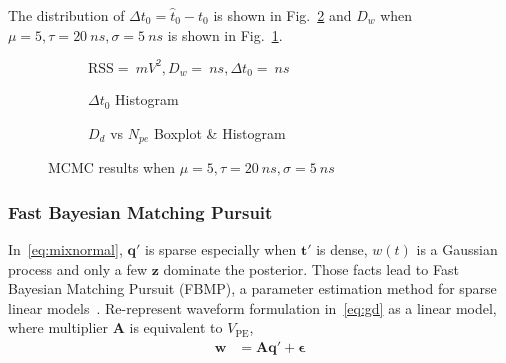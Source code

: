 The distribution of $\Delta{t_0} = \hat{t}_0 - t_0$ is shown in Fig.~\ref{fig:mcmc-t0hist} and $D_w$ when $\mu=5, \tau=\SI{20}{ns}, \sigma=\SI{5}{ns}$ is shown in Fig.~\ref{fig:mcmc}.
\begin{figure}[H]
  \begin{subfigure}{\textwidth}
    \centering
    \resizebox{0.5\textwidth}{!}{}
    \caption{\label{fig:mcmc}$\mathrm{RSS}=\SI{}{mV^2},D_w=\SI{}{ns},\Delta{t_0}=\SI{}{ns}$}
  \end{subfigure}
  \begin{subfigure}{.5\textwidth}
    \centering
    \resizebox{\textwidth}{!}{}
    \caption{\label{fig:mcmc-t0hist} $\Delta t_{0}$ Histogram}
  \end{subfigure}
  \begin{subfigure}{.5\textwidth}
    \centering
    \resizebox{\textwidth}{!}{}
    \caption{\label{fig:mcmc-npe} $D_d$ vs $N_{pe}$ Boxplot \& Histogram}
  \end{subfigure}
  \caption{MCMC results when $\mu=5, \tau=\SI{20}{ns}, \sigma=\SI{5}{ns}$}
\end{figure}

\subsubsection{Fast Bayesian Matching Pursuit}
In~\eqref{eq:mixnormal}, $\bm{q'}$ is sparse especially when $\bm{t'}$ is dense, $w(t)$ is a Gaussian process and only a few $\bm{z}$ dominate the posterior.  Those facts lead to Fast Bayesian Matching Pursuit (FBMP), a parameter estimation method for sparse linear models~\cite{schniter_fast_nodate}. Re-represent waveform formulation in~\eqref{eq:gd} as a linear model, where multiplier $\bm{A}$ is equivalent 
to $V_\mathrm{PE}$, 
\begin{align}
    \bm{w} &= \bm{A}\bm{q'} + \bm{\epsilon} \label{eq:fbmp-li}
\end{align}

